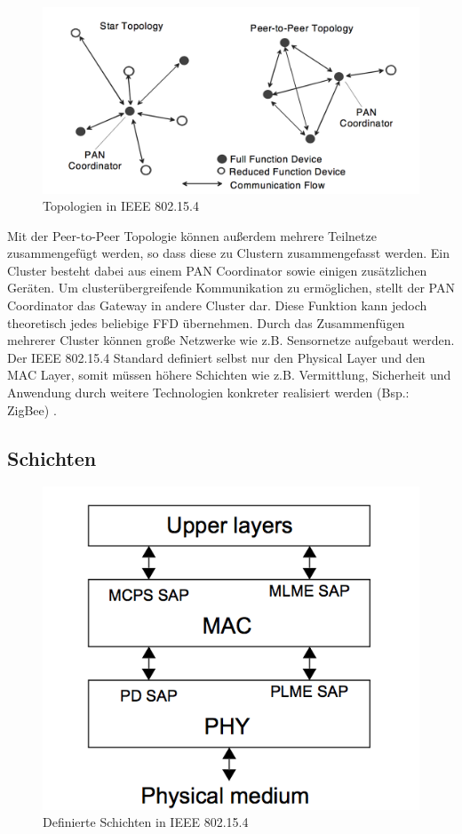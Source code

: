 \begin{figure}[H] 
	\centering
	\includegraphics[scale=0.5]{Bilder/topologies}
	\caption{Topologien in IEEE 802.15.4\cite{d:ieee}}
	\label{f:topologies}
\end{figure}

Mit der Peer-to-Peer Topologie können außerdem mehrere Teilnetze zusammengefügt werden, so dass diese zu Clustern zusammengefasst werden. Ein Cluster besteht dabei aus einem PAN Coordinator sowie einigen zusätzlichen Geräten. Um clusterübergreifende Kommunikation zu ermöglichen, stellt der PAN Coordinator das Gateway in andere Cluster dar. Diese Funktion kann jedoch theoretisch jedes beliebige FFD übernehmen. Durch das Zusammenfügen mehrerer Cluster können große Netzwerke wie z.B. Sensornetze aufgebaut werden. \\
Der IEEE 802.15.4 Standard definiert selbst nur den Physical Layer und den MAC Layer, somit müssen höhere Schichten wie z.B. Vermittlung, Sicherheit und Anwendung durch weitere Technologien konkreter realisiert werden (Bsp.: ZigBee) \cite{d:hesse} \cite{d:ieee}.

\subsection{Schichten}\label{ss:Schichten}

\begin{figure}[H] 
	\centering
	\includegraphics[scale=0.8]{Bilder/schichten}
	\caption{Definierte Schichten in IEEE 802.15.4\cite{d:ieee}}
	\label{f:schichten}
\end{figure}

